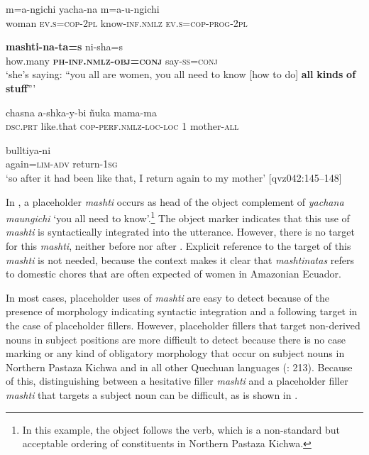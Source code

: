 \documentclass[output=paper]{langscibook}
\begin{document}
\ex \label{ex:rice:11c}
 {m=a-ngichi} {yacha-na} {m=a-u-ngichi}\\
{woman} {\textsc{ev.s=cop-2pl}} {know-\textsc{inf.nmlz}} {\textsc{ev.s=cop-prog-2pl}}\\
\medskip

 {\textbf{mashti-na-ta=s}} {ni-sha=s}\\
{how.many} {\textbf{\textsc{ph-inf.nmlz-obj=conj}}} {say-\textsc{ss=conj}}\\
\glt ‘she’s saying: “you all are women, you all need to know [how to do] \textbf{all} \textbf{kinds} \textbf{of} \textbf{stuff}”’
\medskip

\ex \label{ex:rice:11d}
 {chasna} {a-shka-y-bi} {ñuka}  {mama-ma}\\
\textsc{dsc.prt} {like.that}  {\textsc{cop-perf.nmlz-loc-loc}}  {1}  {mother-\textsc{all}}\\
\medskip

 {bulltiya-ni}\\
{again=\textsc{lim-adv}}   {return-\textsc{1sg}}\\
\glt ‘so after it had been like that, I return again to my mother’ [qvz042:145--148]

\z
\z

In , a placeholder \textit{mashti} occurs as head of the object complement of \textit{yachana maungichi} ‘you all need to know’.\footnote{In this example, the object follows the verb, which is a non-standard but acceptable ordering of constituents in Northern Pastaza Kichwa.}  The object marker indicates that this use of \textit{mashti} is syntactically integrated into the utterance. However, there is no target for this \textit{mashti}, neither before nor after . Explicit reference to the target of this \textit{mashti} is not needed, because the context makes it clear that \textit{mashtinatas} refers to domestic chores that are often expected of women in Amazonian Ecuador.

In most cases, placeholder uses of \textit{mashti} are easy to detect because of the presence of morphology indicating syntactic integration and a following target in the case of placeholder fillers. However, placeholder fillers that target non-derived nouns in subject positions are more difficult to detect because there is no case marking or any kind of obligatory morphology that occur on subject nouns in Northern Pastaza Kichwa and in all other Quechuan languages (\citealt{Adelaar2004}: 213). Because of this, distinguishing between a hesitative filler \textit{mashti} and a placeholder filler \textit{mashti} that targets a subject noun can be difficult, as is shown in .
\end{document}
